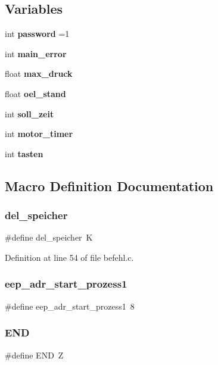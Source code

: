 \subsection*{Variables}
\begin{DoxyCompactItemize}
\item 
int \textbf{ password} =1
\item 
int \textbf{ main\+\_\+error}
\item 
float \textbf{ max\+\_\+druck}
\item 
float \textbf{ oel\+\_\+stand}
\item 
int \textbf{ soll\+\_\+zeit}
\item 
int \textbf{ motor\+\_\+timer}
\item 
int \textbf{ tasten}
\end{DoxyCompactItemize}


\subsection{Macro Definition Documentation}
\mbox{\label{befehl_8c_ab12398cac598c9ba3d84931a780ce987}} 
\subsubsection{del\+\_\+speicher}
{\footnotesize\ttfamily \#define del\+\_\+speicher~\textquotesingle{}K\textquotesingle{}}



Definition at line 54 of file befehl.\+c.

\mbox{\label{befehl_8c_a01a0a6737faa8c3e0cc1f0a4442abbb8}} 
\subsubsection{eep\+\_\+adr\+\_\+start\+\_\+prozess1}
{\footnotesize\ttfamily \#define eep\+\_\+adr\+\_\+start\+\_\+prozess1~8}

\mbox{\label{befehl_8c_a29fd18bed01c4d836c7ebfe73a125c3f}} 
\subsubsection{E\+ND}
{\footnotesize\ttfamily \#define E\+ND~\textquotesingle{}Z\textquotesingle{}}



